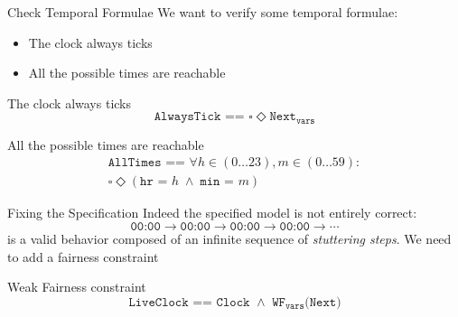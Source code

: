 \begin{frame}{Check Temporal Formulae}
    We want to verify some temporal formulae:
    \begin{itemize}
        \item The clock always ticks
        \item All the possible times are reachable
    \end{itemize}
    \pause
    \begin{block}{The clock always ticks}
        \[
            \texttt{AlwaysTick == } \square \Diamond \texttt{Next}_{\texttt{vars}}
        \]
    \end{block}
    \pause
    \begin{block}{All the possible times are reachable}
        \begin{equation*}
            \begin{gathered}
                \texttt{AllTimes == } \forall h \in (0 \ldots 23), m \in (0 \ldots 59):\\
                \square \Diamond (\texttt{hr = } h\; \land\; \texttt{min = } m)
            \end{gathered}
        \end{equation*}
    \end{block}
    \demo
\end{frame}

\begin{frame}{Fixing the Specification}
    Indeed the specified model is not entirely correct:
    \[
        \texttt{00:00} \rightarrow \texttt{00:00} \rightarrow \texttt{00:00} \rightarrow \texttt{00:00} \rightarrow \cdots
    \]
    is a valid behavior composed of an infinite sequence of \emph{stuttering steps}.
    \pause
    We need to add a fairness constraint
    \begin{block}{Weak Fairness constraint}
        \[
            \texttt{LiveClock == Clock } \land \texttt{ WF}_{\texttt{vars}}\texttt{(Next)}
        \]
    \end{block}
    \demo
\end{frame}
